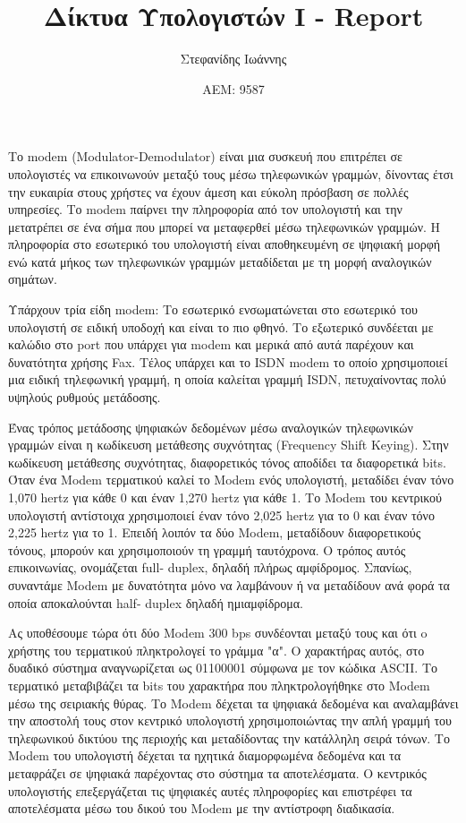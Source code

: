 \documentclass{article}
\title{Δίκτυα Υπολογιστών Ι - Report}
\author{Στεφανίδης Ιωάννης}
\date{ΑΕΜ: 9587}
\begin{document}
\maketitle

Το   modem   (Modulator-Demodulator)   είναι   μια   συσκευή   που επιτρέπει
σε   υπολογιστές   να επικοινωνούν μεταξύ  τους  μέσω τηλεφωνικών  γραμμών,
δίνοντας  έτσι  την  ευκαιρία  στους  χρήστες  να έχουν άμεση και εύκολη
πρόσβαση σε πολλές υπηρεσίες. Το modem παίρνει την πληροφορία από τον υπολογιστή
και την μετατρέπει σε ένα σήμα που μπορεί να μεταφερθεί μέσω τηλεφωνικών
γραμμών. Η πληροφορία στο εσωτερικό του υπολογιστή είναι αποθηκευμένη σε ψηφιακή
μορφή ενώ κατά μήκος των τηλεφωνικών γραμμών μεταδίδεται με τη μορφή αναλογικών
σημάτων.


Υπάρχουν  τρία  είδη  modem:  Το  εσωτερικό  ενσωματώνεται  στο εσωτερικό  του
υπολογιστή  σε  ειδική  υποδοχή  και  είναι  το  πιο φθηνό.  Το εξωτερικό
συνδέεται με καλώδιο στο port που υπάρχει για modem και μερικά από αυτά παρέχουν
και δυνατότητα χρήσης Fax. Τέλος υπάρχει και το ISDN modem το οποίο χρησιμοποιεί
μια ειδική   τηλεφωνική γραμμή,   η   οποία   καλείται   γραμμή   ISDN,
πετυχαίνοντας πολύ υψηλούς ρυθμούς μετάδοσης.


Ένας τρόπος μετάδοσης ψηφιακών δεδομένων μέσω αναλογικών τηλεφωνικών γραμμών
είναι η κωδίκευση μετάθεσης συχνότητας (Frequency Shift Keying). Στην κωδίκευση
μετάθεσης συχνότητας, διαφορετικός τόνος αποδίδει τα διαφορετικά bits. Όταν ένα
Modem τερματικού καλεί το Modem ενός υπολογιστή, μεταδίδει έναν τόνο 1,070 hertz
για κάθε 0 και έναν 1,270 hertz για κάθε 1. Το Modem του κεντρικού υπολογιστή
αντίστοιχα χρησιμοποιεί έναν τόνο  2,025  hertz  για  το  0  και έναν  τόνο
2,225  hertz  για  το  1.  Επειδή  λοιπόν  τα  δύο  Modem, μεταδίδουν
διαφορετικούς τόνους, μπορούν και χρησιμοποιούν τη γραμμή ταυτόχρονα. Ο τρόπος
αυτός  επικοινωνίας,  ονομάζεται  full- duplex, δηλαδή  πλήρως  αμφίδρομος.
Σπανίως,  συναντάμε Modem με δυνατότητα μόνο να λαμβάνουν ή να μεταδίδουν ανά
φορά τα οποία αποκαλούνται half- duplex δηλαδή ημιαμφίδρομα.


Ας υποθέσουμε τώρα ότι δύο Modem 300 bps συνδέονται μεταξύ τους και ότι o
χρήστης του τερματικού πληκτρολογεί το γράμμα "α". Ο χαρακτήρας αυτός, στο
δυαδικό σύστημα αναγνωρίζεται ως 01100001 σύμφωνα  με  τον  κώδικα  ASCII.  Το
τερματικό  μεταβιβάζει  τα  bits του χαρακτήρα που πληκτρολογήθηκε στο Modem
μέσω της σειριακής θύρας.  Το Modem δέχεται τα ψηφιακά δεδομένα και αναλαμβάνει
την αποστολή τους στον κεντρικό υπολογιστή χρησιμοποιώντας την απλή γραμμή του
τηλεφωνικού δικτύου της περιοχής  και μεταδίδοντας την κατάλληλη σειρά τόνων. Το
Modem του υπολογιστή δέχεται τα ηχητικά διαμορφωμένα δεδομένα και τα μεταφράζει
σε ψηφιακά παρέχοντας στο σύστημα τα αποτελέσματα. Ο κεντρικός υπολογιστής
επεξεργάζεται τις ψηφιακές αυτές πληροφορίες και επιστρέφει τα αποτελέσματα μέσω
του δικού του Modem με την αντίστροφη διαδικασία.
\end{document}
